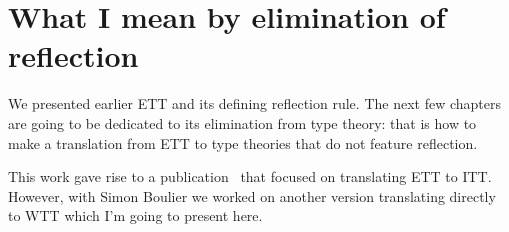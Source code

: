 \setchapterpreamble[u]{\margintoc}
\chapter{What I mean by elimination of reflection}

We presented earlier ETT and its defining reflection rule.
%
%
The next few chapters are going to be dedicated to its elimination from type
theory: that is how to make a translation from ETT to type theories that do
not feature reflection.

This work gave rise to a publication~ that
focused on translating ETT to ITT. However, with Simon Boulier we worked on
another version translating directly to WTT which I'm going to present here.